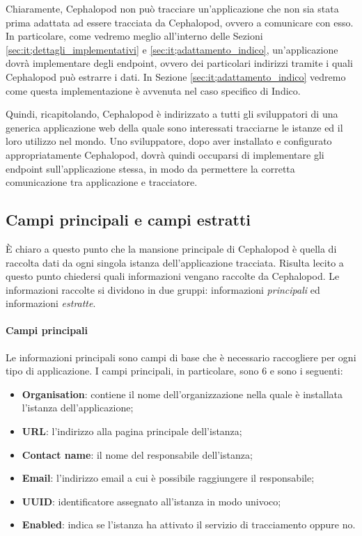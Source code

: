             Chiaramente, Cephalopod non può tracciare un'applicazione che non sia stata prima adattata ad essere tracciata da Cephalopod, ovvero a comunicare con esso. In particolare, come vedremo meglio all'interno delle Sezioni \ref{sec:it;dettagli_implementativi} e \ref{sec:it;adattamento_indico}, un'applicazione dovrà implementare degli endpoint, ovvero dei particolari indirizzi tramite i quali Cephalopod può estrarre i dati. In Sezione \ref{sec:it;adattamento_indico} vedremo come questa implementazione è avvenuta nel caso specifico di Indico.
            
            Quindi, ricapitolando, Cephalopod è indirizzato a tutti gli sviluppatori di una generica applicazione web della quale sono interessati tracciarne le istanze ed il loro utilizzo nel mondo. Uno sviluppatore, dopo aver installato e configurato appropriatamente Cephalopod, dovrà quindi occuparsi di implementare gli endpoint sull'applicazione stessa, in modo da permettere la corretta comunicazione tra applicazione e tracciatore.
            
        \subsection{Campi principali e campi estratti} \label{subsec:it;cp;campi_principali_campi_estratti}
        
            È chiaro a questo punto che la mansione principale di Cephalopod è quella di raccolta dati da ogni singola istanza dell'applicazione tracciata. Risulta lecito a questo punto chiedersi quali informazioni vengano raccolte da Cephalopod.
            Le informazioni raccolte si dividono in due gruppi: informazioni \textit{principali} ed informazioni \textit{estratte}.
            
            \paragraph{Campi principali}Le informazioni principali sono campi di base che è necessario raccogliere per ogni tipo di applicazione. I campi principali, in particolare, sono 6 e sono i seguenti:
            
            \begin{itemize}
                \item \textbf{Organisation}: contiene il nome dell'organizzazione nella quale è installata l'istanza dell'applicazione;
                \item \textbf{URL}: l'indirizzo alla pagina principale dell'istanza;
                \item \textbf{Contact name}: il nome del responsabile dell'istanza;
                \item \textbf{Email}: l'indirizzo email a cui è possibile raggiungere il responsabile;
                \item \textbf{UUID}: identificatore  assegnato all'istanza in modo univoco;
                \item \textbf{Enabled}: indica se l'istanza ha attivato il servizio di tracciamento oppure no.
            \end{itemize}
            
